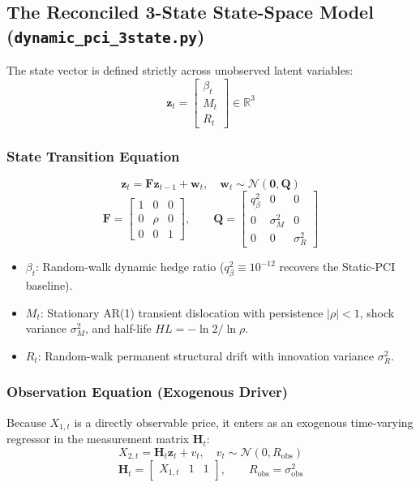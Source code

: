 \documentclass[11pt, a4paper]{article}
\begin{document}
\subsection{The Reconciled 3-State State-Space Model (\texttt{dynamic\_pci\_3state.py})}
The state vector is defined strictly across unobserved latent variables:
\begin{equation}
    \mathbf{z}_t = \begin{bmatrix} \beta_t \\ M_t \\ R_t \end{bmatrix} \in \mathbb{R}^3
\end{equation}

\subsubsection{State Transition Equation}
\begin{equation}
    \mathbf{z}_t = \mathbf{F} \mathbf{z}_{t-1} + \mathbf{w}_t, \quad \mathbf{w}_t \sim \mathcal{N}(\mathbf{0}, \mathbf{Q})
\end{equation}
\begin{equation}
    \mathbf{F} = \begin{bmatrix} 1 & 0 & 0 \\ 0 & \rho & 0 \\ 0 & 0 & 1 \end{bmatrix}, \qquad
    \mathbf{Q} = \begin{bmatrix} q_\beta^2 & 0 & 0 \\ 0 & \sigma_M^2 & 0 \\ 0 & 0 & \sigma_R^2 \end{bmatrix}
\end{equation}
\begin{itemize}
    \item $\beta_t$: Random-walk dynamic hedge ratio ($q_\beta^2 \equiv 10^{-12}$ recovers the Static-PCI baseline).
    \item $M_t$: Stationary AR(1) transient dislocation with persistence $|\rho| < 1$, shock variance $\sigma_M^2$, and half-life $HL = -\ln 2 / \ln \rho$.
    \item $R_t$: Random-walk permanent structural drift with innovation variance $\sigma_R^2$.
\end{itemize}

\subsubsection{Observation Equation (Exogenous Driver)}
Because $X_{1,t}$ is a directly observable price, it enters as an exogenous time-varying regressor in the measurement matrix $\mathbf{H}_t$:
\begin{equation}
    X_{2,t} = \mathbf{H}_t \mathbf{z}_t + v_t, \quad v_t \sim \mathcal{N}(0, R_{\text{obs}})
\end{equation}
\begin{equation}
    \mathbf{H}_t = \begin{bmatrix} X_{1,t} & 1 & 1 \end{bmatrix}, \qquad R_{\text{obs}} = \sigma_{\text{obs}}^2
\end{equation}
\end{document}
